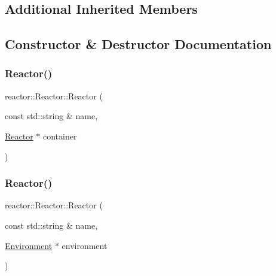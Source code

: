 \subsection*{Additional Inherited Members}


\subsection{Constructor \& Destructor Documentation}
\mbox{\label{classreactor_1_1Reactor_a277765a261141f60ea6e8565533eb71c}} 
\subsubsection{\texorpdfstring{Reactor()}{Reactor()}\hspace{0.1cm}{\footnotesize\ttfamily [1/2]}}
{\footnotesize\ttfamily reactor\+::\+Reactor\+::\+Reactor (\begin{DoxyParamCaption}\item[{const std\+::string \&}]{name,  }\item[{\hyperlink{classreactor_1_1Reactor}{Reactor} $\ast$}]{container }\end{DoxyParamCaption})}

\mbox{\label{classreactor_1_1Reactor_af00ec5a8d0efcca675fc06d474181371}} 
\subsubsection{\texorpdfstring{Reactor()}{Reactor()}\hspace{0.1cm}{\footnotesize\ttfamily [2/2]}}
{\footnotesize\ttfamily reactor\+::\+Reactor\+::\+Reactor (\begin{DoxyParamCaption}\item[{const std\+::string \&}]{name,  }\item[{\hyperlink{classreactor_1_1Environment}{Environment} $\ast$}]{environment }\end{DoxyParamCaption})}

\mbox{\label{classreactor_1_1Reactor_a71a86bb46592e350cf173db091be6d50}} 
